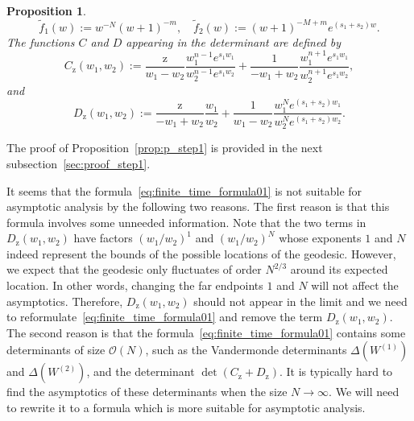 \documentclass{article}
\newtheorem{prop}[thm]{Proposition}
\numberwithin{equation}{section}
\newcommand{\bigO}{\mathcal{O}}
\newcommand{\rz}{\mathrm{z}}
\begin{document}
\begin{prop}
\begin{equation}
		\label{eq:tilde_f}
	\tilde f_1 (w) := w^{-N} (w+1)^{-m},\quad \tilde f_2 (w) := (w+1)^{-M+m} e^{(s_1+s_2) w}.
	\end{equation}
	The functions $C$ and $D$ appearing in the determinant are defined by
	\begin{equation}
		\label{eq:C}
	C_\rz(w_1,w_2):=   \frac{ \rz } {w_1-w_2}
	                   \frac{ w_1^{n-1} e^{s_1 w_1} }
	                        { w_2^{n-1} e^{s_1 w_2} }
	                +  \frac{ 1 } {-w_1+w_2}
	                   \frac{ w_1^{n+1} e^{s_1 w_1} }
	                        { w_2^{n+1} e^{s_1 w_2} },
	\end{equation}
	and
	\begin{equation}
		\label{eq:D}
	D_\rz(w_1,w_2):=   \frac{ \rz } {-w_1+w_2}
	                   \frac{ w_1 } { w_2 }
	                +  \frac{ 1 } {w_1-w_2}
	                   \frac{ w_1^{N} e^{(s_1+s_2) w_1} }
	                        { w_2^{N} e^{(s_1+s_2) w_2} }.
	\end{equation}
\end{prop}

\bigskip

The proof of Proposition~\ref{prop:p_step1} is provided in the next subsection~\ref{sec:proof_step1}.

\bigskip

It seems that the formula~\eqref{eq:finite_time_formula01} is not suitable for asymptotic analysis by the following two reasons. The first reason is that this formula involves some unneeded information. Note that the two terms in $D_\rz(w_1,w_2)$ have factors $(w_1/w_2)^1$ and $(w_1/w_2)^N$ whose exponents $1$ and $N$ indeed represent the bounds of the possible locations of the geodesic. However, we expect that the geodesic only fluctuates of order $N^{2/3}$ around its expected location. In other words, changing the far endpoints $1$ and $N$ will not affect the asymptotics. Therefore, $D_\rz(w_1,w_2)$ should not appear in the limit and we need to reformulate~\eqref{eq:finite_time_formula01} and remove the term $D_\rz(w_1,w_2)$. The second reason is that the formula~\eqref{eq:finite_time_formula01} contains some determinants of size $\bigO(N)$, such as the Vandermonde determinants $\Delta\left(W^{(1)}\right)$ and $\Delta\left(W^{(2)}\right)$, and the determinant $\det(C_\rz+D_\rz)$. It is typically hard to find the asymptotics of these determinants when the size $N\to\infty$. We will need to rewrite it to a formula which is more suitable for asymptotic analysis.

\bigskip
\end{document}
